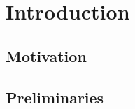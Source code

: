 \chapter{Introduction}
\label{ch:Introduction}

\section{Motivation}
\label{sec:Motivation}

\section{Preliminaries}
\label{sec:Preliminaries}
